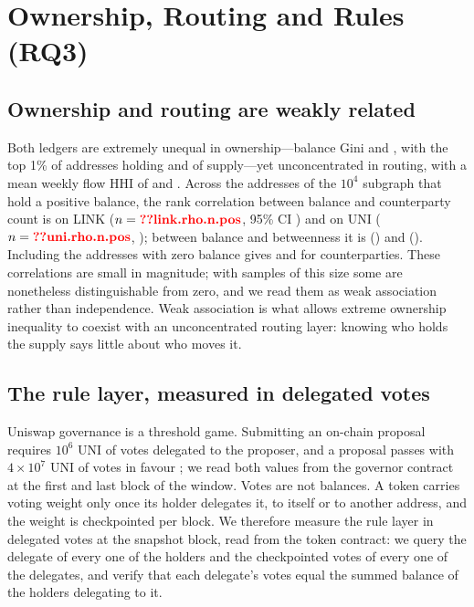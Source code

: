 \section{Ownership, Routing and Rules (RQ3)}
\label{sec:layers}

\subsection{Ownership and routing are weakly related}
\label{sec:wealth-power}
Both ledgers are extremely unequal in ownership---balance Gini
 and , with the top 1\% of addresses holding
 and  of supply---yet unconcentrated in routing,
with a mean weekly flow HHI of  and .
Across the addresses of the $10^{4}$ subgraph that hold a positive balance,
the rank correlation between balance and counterparty count is
 on LINK ($n = \V{link.rho.n.pos}$, 95\% CI
) and  on UNI
($n = \V{uni.rho.n.pos}$, ); between balance and
betweenness it is  () and
 (). Including the addresses with
zero balance gives 
and  for counterparties. These correlations are small in
magnitude; with samples of this size some are nonetheless distinguishable
from zero, and we read them as weak association rather than independence.
Weak association is what allows extreme ownership inequality to coexist with
an unconcentrated routing layer: knowing who holds the supply says little
about who moves it.

\subsection{The rule layer, measured in delegated votes}
\label{sec:governance}
Uniswap governance is a threshold game. Submitting an on-chain proposal
requires $10^{6}$ UNI of votes delegated to the proposer, and a proposal
passes with $4\times10^{7}$ UNI of votes in favour
\cite{uniswap2026governance}; we read both values from the governor contract
at the first and last block of the window. Votes are not balances. A token
carries voting weight only once its holder delegates it, to itself or to
another address, and the weight is checkpointed per block. We therefore
measure the rule layer in delegated votes at the snapshot block, read from
the token contract: we query the delegate of every one of the 
holders and the checkpointed votes of every one of the
 delegates, and verify that each delegate's votes
equal the summed balance of the holders delegating to it.

